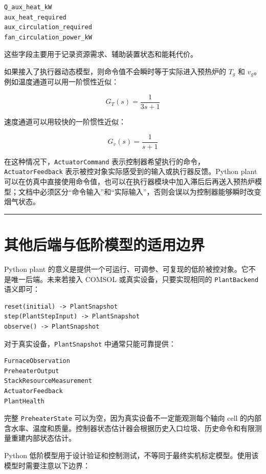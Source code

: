 \documentclass[UTF8,openany,zihao=-4,oneside]{ctexbook}
\providecommand{\passthrough}[1]{#1}
\newcommand{\manualdivider}{\par\vspace{0.6em}\noindent\textcolor{FGLine}{\rule{\linewidth}{0.7pt}}\vspace{0.6em}\par}
\begin{document}
\begin{lstlisting}
Q_aux_heat_kW
aux_heat_required
aux_circulation_required
fan_circulation_power_kW
\end{lstlisting}

这些字段主要用于记录资源需求、辅助装置状态和能耗代价。

如果接入了执行器动态模型，则命令值不会瞬时等于实际进入预热炉的 \(T_g\) 和 \(v_g\)。例如温度通道可以用一阶惯性近似：

\[
G_T(s)=\frac{1}{3s+1}
\]

速度通道可以用较快的一阶惯性近似：

\[
G_v(s)=\frac{1}{s+1}
\]

在这种情况下，\passthrough{\lstinline!ActuatorCommand!} 表示控制器希望执行的命令，\passthrough{\lstinline!ActuatorFeedback!} 表示被控对象实际感受到的输入或执行器反馈。Python plant 可以在仿真中直接使用命令值，也可以在执行器模块中加入滞后后再送入预热炉模型；文档中必须区分“命令输入”和“实际输入”，否则会误以为控制器能够瞬时改变烟气状态。

\manualdivider

\section{其他后端与低阶模型的适用边界}\label{ux4e0eux771fux5b9eux8bbeux5907ux548c-comsol-ux540eux7aefux7684ux5173ux7cfb}

Python plant 的意义是提供一个可运行、可调参、可复现的低阶被控对象。它不是唯一后端。未来若接入 COMSOL 或真实设备，只要实现相同的 \passthrough{\lstinline!PlantBackend!} 语义即可：

\begin{lstlisting}
reset(initial) -> PlantSnapshot
step(PlantStepInput) -> PlantSnapshot
observe() -> PlantSnapshot
\end{lstlisting}

对于真实设备，\passthrough{\lstinline!PlantSnapshot!} 中通常只能可靠提供：

\begin{lstlisting}
FurnaceObservation
PreheaterOutput
StackResourceMeasurement
ActuatorFeedback
PlantHealth
\end{lstlisting}

完整 \passthrough{\lstinline!PreheaterState!} 可以为空，因为真实设备不一定能观测每个轴向 cell 的内部含水率、温度和质量。控制器状态估计器会根据历史入口垃圾、历史命令和有限测量重建内部状态估计。

Python 低阶模型用于设计验证和控制测试，不等同于最终实机标定模型。使用该模型时需要注意以下边界：
\end{document}
